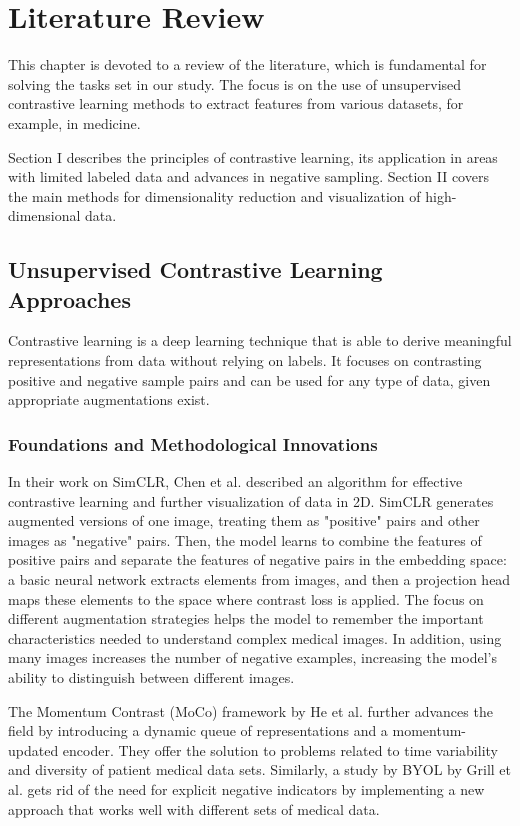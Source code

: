 \chapter{Literature Review}
\label{chap:lr}

This chapter is devoted to a review of the literature, which is fundamental for solving the tasks set in our study. The focus is on the use of unsupervised contrastive learning methods to extract features from various datasets, for example, in medicine. 

Section I describes the principles of contrastive learning, its application in areas with limited labeled data and advances in negative sampling. Section II covers the main methods for dimensionality reduction and visualization of high-dimensional data.

\section{Unsupervised Contrastive Learning Approaches}
Contrastive learning is a deep learning technique that is able to derive meaningful representations from data without relying on labels. It focuses on contrasting positive and negative sample pairs and can be used for any type of data, given appropriate augmentations exist.

\subsection{Foundations and Methodological Innovations}

In their work on SimCLR, Chen et al. \cite{tsimcne} described an algorithm for effective contrastive learning and further visualization of data in 2D. SimCLR generates augmented versions of one image, treating them as "positive" pairs and other images as "negative" pairs. Then, the model learns to combine the features of positive pairs and separate the features of negative pairs in the embedding space: a basic neural network extracts elements from images, and then a projection head maps these elements to the space where contrast loss is applied. The focus on different augmentation strategies helps the model to remember the important characteristics needed to understand complex medical images. In addition, using many images increases the number of negative examples, increasing the model's ability to distinguish between different images.

The Momentum Contrast (MoCo) framework by He et al. \cite{moco} further advances the field by introducing a dynamic queue of representations and a momentum-updated encoder. They offer the solution to problems related to time variability and diversity of patient medical data sets. Similarly, a study by BYOL by Grill et al. \cite{byol} gets rid of the need for explicit negative indicators by implementing a new approach that works well with different sets of medical data.

